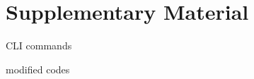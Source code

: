 \documentclass{article}
\begin{document}
\section*{Supplementary Material}

CLI commands

modified codes



\end{document}
